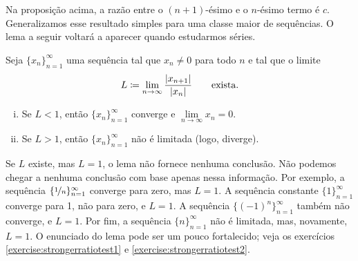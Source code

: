 Na proposição acima, a
razão entre o $(n+1)$-ésimo e o $n$-ésimo termo é $c$. Generalizamos
esse resultado simples para uma classe maior de sequências.
O lema a seguir voltará a aparecer quando estudarmos séries.

\begin{lemma}
\label{seq:ratiotest}
Seja $\{ x_n \}_{n=1}^\infty$ uma sequência tal que $x_n \neq 0$ para todo $n$ e tal que o limite
\begin{equation*}
L \coloneqq \lim_{n\to\infty} \frac{\lvert {x_{n+1}} \rvert}{\lvert {x_n} \rvert}
\qquad
\text{exista.}
\end{equation*}
\begin{enumerate}[(i)]
\item
Se $L < 1$, então $\{ x_n \}_{n=1}^\infty$ converge e $\lim\limits_{n\to\infty} x_n = 0$.
\item
Se $L > 1$, então $\{ x_n \}_{n=1}^\infty$ não é limitada (logo, diverge).
\end{enumerate}
\end{lemma}

Se $L$ existe, mas $L=1$, o lema não fornece nenhuma conclusão.
Não podemos chegar a nenhuma
conclusão com base apenas nessa informação. Por exemplo,
a sequência $\{ \nicefrac{1}{n} \}_{n=1}^\infty$ converge para zero, mas $L=1$.
A sequência constante $\{ 1 \}_{n=1}^\infty$ converge para 1, não para zero, e
$L=1$. A sequência $\bigl\{ {(-1)}^n \bigr\}_{n=1}^\infty$ também não converge, e $L=1$.
Por fim, a sequência $\{ n \}_{n=1}^\infty$ não é limitada, mas, novamente, $L=1$.
O enunciado do lema pode ser um pouco fortalecido; veja os
exercícios \ref{exercise:strongerratiotest1} e
\ref{exercise:strongerratiotest2}.

